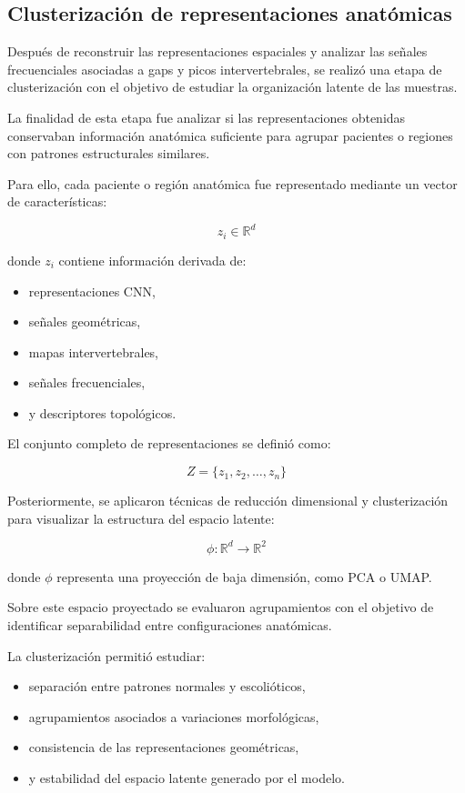 \documentclass[conference]{IEEEtran}
\begin{document}
\subsection{Clusterización de representaciones anatómicas}

Después de reconstruir las representaciones espaciales y analizar las señales frecuenciales asociadas a gaps y picos intervertebrales, se realizó una etapa de clusterización con el objetivo de estudiar la organización latente de las muestras.

La finalidad de esta etapa fue analizar si las representaciones obtenidas conservaban información anatómica suficiente para agrupar pacientes o regiones con patrones estructurales similares.

Para ello, cada paciente o región anatómica fue representado mediante un vector de características:

\[
z_i \in \mathbb{R}^{d}
\]

donde \(z_i\) contiene información derivada de:

\begin{itemize}
    \item representaciones CNN,
    \item señales geométricas,
    \item mapas intervertebrales,
    \item señales frecuenciales,
    \item y descriptores topológicos.
\end{itemize}

El conjunto completo de representaciones se definió como:

\[
Z = \{z_1,z_2,\dots,z_n\}
\]

Posteriormente, se aplicaron técnicas de reducción dimensional y clusterización para visualizar la estructura del espacio latente:

\[
\phi: \mathbb{R}^{d} \rightarrow \mathbb{R}^{2}
\]

donde \(\phi\) representa una proyección de baja dimensión, como PCA o UMAP.

Sobre este espacio proyectado se evaluaron agrupamientos con el objetivo de identificar separabilidad entre configuraciones anatómicas.

La clusterización permitió estudiar:

\begin{itemize}
    \item separación entre patrones normales y escolióticos,
    \item agrupamientos asociados a variaciones morfológicas,
    \item consistencia de las representaciones geométricas,
    \item y estabilidad del espacio latente generado por el modelo.
\end{itemize}
\end{document}
